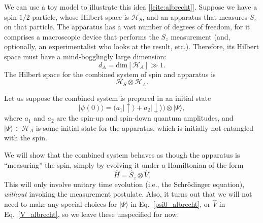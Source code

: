 \documentclass[pra,12pt]{revtex4-2}
\begin{document}
We can use a toy model to illustrate this idea [\ref{cite:albrecht}].
Suppose we have a spin-$1/2$ particle, whose Hilbert space is
$\mathscr{H}_S$, and an apparatus that measures $S_z$ on that
particle.  The apparatus has a vast number of degrees of freedom, for
it comprises a macroscopic device that performs the $S_z$ measurement
(and, optionally, an experimentalist who looks at the result, etc.).
Therefore, its Hilbert space must have a mind-bogglingly large
dimension:
\begin{equation}
  d_A = \mathrm{dim}[\mathscr{H}_A] \gg 1.
\end{equation}
The Hilbert space for the combined system of spin and apparatus is
\begin{equation}
  \mathscr{H}_S \otimes \mathscr{H}_A.
\end{equation}

Let us suppose the combined system is prepared in an initial state
\begin{equation}
  |\psi(0)\rangle = \Big(a_1 |\!\uparrow\rangle + a_2 |\!\downarrow\rangle\Big) \otimes |\Psi\rangle,
  \label{psi0_albrecht}
\end{equation}
where $a_1$ and $a_2$ are the spin-up and spin-down quantum
amplitudes, and $|\Psi\rangle \in \mathscr{H}_A$ is some initial state
for the apparatus, which is initially not entangled with the spin.

We will show that the combined system behaves as though the apparatus
is ``measuring'' the spin, simply by evolving it under a Hamiltonian
of the form
\begin{equation}
  \hat{H} = \hat{S}_z \otimes \hat{V}.
  \label{V_albrecht}
\end{equation}
This will only involve unitary time evolution (i.e., the Schr\"odinger
equation), \textit{without} invoking the measurement postulate.  Also,
it turns out that we will not need to make any special choices for
$|\Psi\rangle$ in Eq.~\eqref{psi0_albrecht}, or $\hat{V}$ in
Eq.~\eqref{V_albrecht}, so we leave these unspecified for now.
\end{document}
